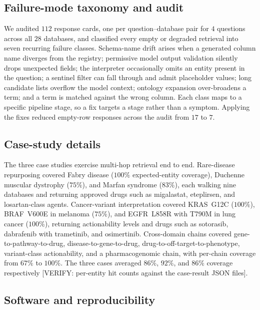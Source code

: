 \subsection*{Failure-mode taxonomy and audit}

We audited $112$ response cards, one per question--database pair for $4$ questions across all $28$ databases, and classified every empty or degraded retrieval into seven recurring failure classes. Schema-name drift arises when a generated column name diverges from the registry; permissive model output validation silently drops unexpected fields; the interpreter occasionally omits an entity present in the question; a sentinel filter can fall through and admit placeholder values; long candidate lists overflow the model context; ontology expansion over-broadens a term; and a term is matched against the wrong column. Each class maps to a specific pipeline stage, so a fix targets a stage rather than a symptom. Applying the fixes reduced empty-row responses across the audit from $17$ to $7$.

\subsection*{Case-study details}

The three case studies exercise multi-hop retrieval end to end. Rare-disease repurposing covered Fabry disease ($100\%$ expected-entity coverage), Duchenne muscular dystrophy ($75\%$), and Marfan syndrome ($83\%$), each walking nine databases and returning approved drugs such as migalastat, eteplirsen, and losartan-class agents. Cancer-variant interpretation covered KRAS~G12C ($100\%$), BRAF~V600E in melanoma ($75\%$), and EGFR~L858R with T790M in lung cancer ($100\%$), returning actionability levels and drugs such as sotorasib, dabrafenib with trametinib, and osimertinib. Cross-domain chains covered gene-to-pathway-to-drug, disease-to-gene-to-drug, drug-to-off-target-to-phenotype, variant-class actionability, and a pharmacogenomic chain, with per-chain coverage from $67\%$ to $100\%$. The three cases averaged $86\%$, $92\%$, and $86\%$ coverage respectively [VERIFY: per-entity hit counts against the case-result JSON files].

\subsection*{Software and reproducibility}

